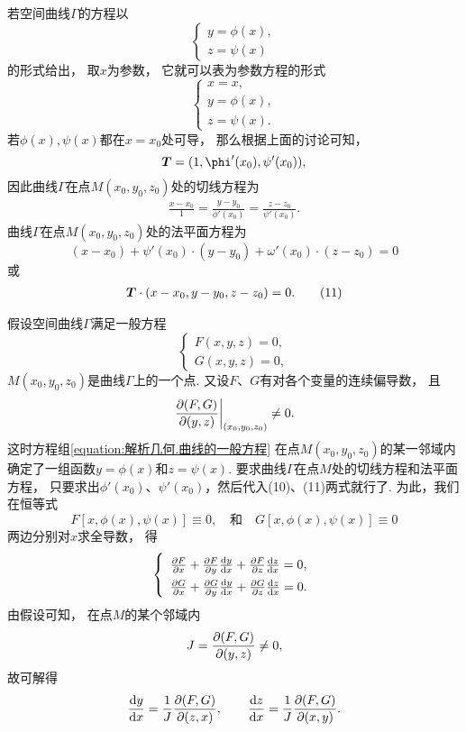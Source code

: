 若空间曲线\(\Gamma\)的方程以\[
	\left\{ \begin{array}{l}
		y = \phi(x), \\
		z = \psi(x)
	\end{array} \right.
\]的形式给出，
取\(x\)为参数，
它就可以表为参数方程的形式\[
	\left\{ \begin{array}{l}
		x = x, \\
		y = \phi(x), \\
		z = \psi(x).
	\end{array} \right.
\]
若\(\phi(x),\psi(x)\)都在\(x=x_0\)处可导，
那么根据上面的讨论可知，\[
	\vb{T} = (1,\phi'(x_0),\psi'(x_0)),
\]
因此曲线\(\Gamma\)在点\(M(x_0,y_0,z_0)\)处的切线方程为
\begin{gather}
	\frac{x-x_0}{1}
	=\frac{y-y_0}{\phi'(x_0)}
	=\frac{z-z_0}{\psi'(x_0)}.
	\tag{10}
\end{gather}
曲线\(\Gamma\)在点\(M(x_0,y_0,z_0)\)处的法平面方程为\[
	(x-x_0) + \psi'(x_0) \cdot (y-y_0) + \omega'(x_0) \cdot (z-z_0) = 0
\]或\begin{gather}
	\boldsymbol{T}\cdot(x-x_0,y-y_0,z-z_0)=0.
	\tag{11}
\end{gather}

假设空间曲线\(\Gamma\)满足一般方程 
\[
	\left\{ \begin{array}{l}
		F(x,y,z) = 0, \\
		G(x,y,z) = 0,
	\end{array} \right.
\]
\(M(x_0,y_0,z_0)\)是曲线\(\Gamma\)上的一个点.
又设\(F\)、\(G\)有对各个变量的连续偏导数，
且\[
	\eval{\jacobi{F,G}{y,z}}_{(x_0,y_0,z_0)} \neq 0.
\]
这时方程组\cref{equation:解析几何.曲线的一般方程}
在点\(M(x_0,y_0,z_0)\)的某一邻域内确定了一组函数\(y=\phi(x)\)和\(z=\psi(x)\).
要求曲线\(\Gamma\)在点\(M\)处的切线方程和法平面方程，
只要求出\(\phi'(x_0)\)、\(\psi'(x_0)\)，然后代入(10)、(11)两式就行了.
为此，我们在恒等式\[
	F[x,\phi(x),\psi(x)] \equiv 0,
	\quad\text{和}\quad
	G[x,\phi(x),\psi(x)] \equiv 0
\]两边分别对\(x\)求全导数，
得\[
	\left\{ \def\arraystretch{1.5} \begin{array}{l}
		\pdv{F}{x} + \pdv{F}{y} \dv{y}{x} + \pdv{F}{z} \dv{z}{x} = 0, \\
		\pdv{G}{x} + \pdv{G}{y} \dv{y}{x} + \pdv{G}{z} \dv{z}{x} = 0.
	\end{array} \right.
\]
由假设可知，
在点\(M\)的某个邻域内\[
	J = \pdv{ (F,G) }{ (y,z) } \neq 0,
\]
故可解得\[
	\dv{y}{x} = \frac{1}{J} \pdv{ (F,G) }{ (z,x) },
	\qquad
	\dv{z}{x} = \frac{1}{J} \pdv{ (F,G) }{ (x,y) }.
\]


